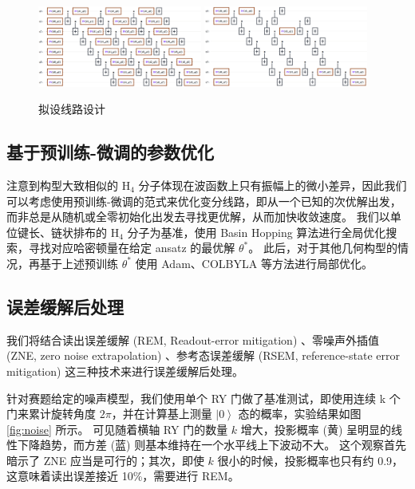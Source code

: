 \documentclass[withoutpreface,bwprint]{cumcmthesis}
\begin{document}
\begin{figure}
	\centering
	{\includegraphics[width=0.48\textwidth]{figures/ansatz-before.png}}
	{\includegraphics[width=0.48\textwidth]{figures/ansatz-after.png}}
	\caption{拟设线路设计}
	\label{fig:ansatz}
\end{figure}

\subsection{基于预训练-微调的参数优化}

注意到构型大致相似的 $ \mathrm{H}_4 $ 分子体现在波函数上只有振幅上的微小差异，因此我们可以考虑使用预训练-微调的范式来优化变分线路，即从一个已知的次优解出发，而非总是从随机或全零初始化出发去寻找更优解，从而加快收敛速度。
我们以单位键长、链状排布的 $ \mathrm{H}_4 $ 分子为基准，使用 Basin Hopping 算法进行全局优化搜索，寻找对应哈密顿量在给定 ansatz 的最优解 $ \theta^\ast $。
此后，对于其他几何构型的情况，再基于上述预训练 $ \theta^\ast $ 使用 Adam、COLBYLA 等方法进行局部优化。

\subsection{误差缓解后处理}

我们将结合读出误差缓解 (REM, Readout-error mitigation) \cite{REM2021} 、零噪声外插值 (ZNE, zero noise extrapolation) \cite{ZNE2017} 、参考态误差缓解 (RSEM, reference-state error mitigation) \cite{RSEM2022} 这三种技术来进行误差缓解后处理。

针对赛题给定的噪声模型，我们使用单个 RY 门做了基准测试，即使用连续 k 个门来累计旋转角度 $ 2 \pi $，并在计算基上测量 $ \left| 0 \right> $ 态的概率，实验结果如图 \ref{fig:noise} 所示。
可见随着横轴 RY 门的数量 $ k $ 增大，投影概率 (黄) 呈明显的线性下降趋势，而方差 (蓝) 则基本维持在一个水平线上下波动不大。
这个观察首先暗示了 ZNE 应当是可行的；其次，即使 $ k $ 很小的时候，投影概率也只有约 0.9，这意味着读出误差接近 10\%，需要进行 REM。
\end{document}

